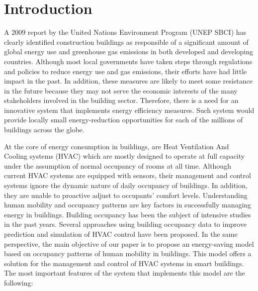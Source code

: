 \section{Introduction}
\label{sec:intro}

A 2009 report by the United Nations Environment Program (UNEP SBCI)
\cite{huovila2009buildings} has clearly identified  construction
buildings as responsible of a significant amount of global energy use
and greenhouse gas emissions in both developed and developing
countries. Although most local governments have taken steps through
regulations and policies to reduce energy use and gas emissions, their
efforts have had little impact in the past. In addition,  these
measures are likely to meet some resistance in the future because they
may not serve the economic interests of the many stakeholders involved
in the building sector. Therefore,  there is a need for an innovative
system that implements energy efficiency measures. Such system would
provide locally small energy-reduction opportunities for each of the
millions of buildings across the globe.

At the core of energy consumption in buildings, are Heat Ventilation
And Cooling systems (HVAC) which are mostly designed to operate at
full capacity under the assumption of normal occupancy of rooms at all
time. Although current HVAC systems are equipped with sensors, their
management and control systems ignore the dynamic nature of daily
occupancy of buildings. In addition, they are unable to proactive
adjust to occupants' comfort levels. Understanding	human mobility
and occupancy patterns are key factors in successfully managing energy
in buildings. Building occupancy has been the subject of intensive
studies in the past years. Several approaches using building occupancy
data to improve prediction and simulation of HVAC control have been
proposed. In the same perspective, the main objective of our paper is
to propose an energy-saving model based on occupancy patterns of human
mobility in buildings. This model offers a solution for the management
and control of HVAC systems in smart buildings. The most important
features of the system that implements this model are the following:

